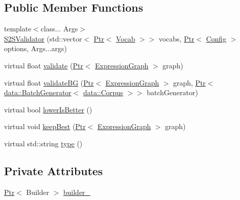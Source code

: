 \subsection*{Public Member Functions}
\begin{DoxyCompactItemize}
\item 
{\footnotesize template$<$class... Args$>$ }\\\hyperlink{classmarian_1_1S2SValidator_a0ff038a7d2c76b6ed7c4cb7d1a8bf46a}{S2\+S\+Validator} (std\+::vector$<$ \hyperlink{namespacemarian_ad1a373be43a00ef9ce35666145137b08}{Ptr}$<$ \hyperlink{classmarian_1_1Vocab}{Vocab} $>$$>$ vocabs, \hyperlink{namespacemarian_ad1a373be43a00ef9ce35666145137b08}{Ptr}$<$ \hyperlink{classmarian_1_1Config}{Config} $>$ options, Args...\+args)
\item 
virtual float \hyperlink{classmarian_1_1S2SValidator_aef728e7e102607d2d69d96aa4906d128}{validate} (\hyperlink{namespacemarian_ad1a373be43a00ef9ce35666145137b08}{Ptr}$<$ \hyperlink{classmarian_1_1ExpressionGraph}{Expression\+Graph} $>$ graph)
\item 
virtual float \hyperlink{classmarian_1_1S2SValidator_a4b6ef1beacf57dce676851f740700573}{validate\+BG} (\hyperlink{namespacemarian_ad1a373be43a00ef9ce35666145137b08}{Ptr}$<$ \hyperlink{classmarian_1_1ExpressionGraph}{Expression\+Graph} $>$ graph, \hyperlink{namespacemarian_ad1a373be43a00ef9ce35666145137b08}{Ptr}$<$ \hyperlink{classmarian_1_1data_1_1BatchGenerator}{data\+::\+Batch\+Generator}$<$ \hyperlink{classmarian_1_1data_1_1Corpus}{data\+::\+Corpus} $>$$>$ batch\+Generator)
\item 
virtual bool \hyperlink{classmarian_1_1S2SValidator_aea688081d232cfd12523c54b4869148a}{lower\+Is\+Better} ()
\item 
virtual void \hyperlink{classmarian_1_1S2SValidator_ae5a8f8799039bdac36790ef06158249e}{keep\+Best} (\hyperlink{namespacemarian_ad1a373be43a00ef9ce35666145137b08}{Ptr}$<$ \hyperlink{classmarian_1_1ExpressionGraph}{Expression\+Graph} $>$ graph)
\item 
virtual std\+::string \hyperlink{classmarian_1_1S2SValidator_a66b288aad453a7bf669b3542cd35f564}{type} ()
\end{DoxyCompactItemize}
\subsection*{Private Attributes}
\begin{DoxyCompactItemize}
\item 
\hyperlink{namespacemarian_ad1a373be43a00ef9ce35666145137b08}{Ptr}$<$ Builder $>$ \hyperlink{classmarian_1_1S2SValidator_addec49567df7b879e4a698cb237ca64d}{builder\+\_\+}
\end{DoxyCompactItemize}
